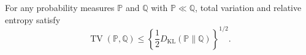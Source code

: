 For any probability measures \(\mathbb P\) and \(\mathbb Q\) with
\(\mathbb P\ll\mathbb Q\), total variation and relative entropy satisfy
\[
\operatorname{TV}(\mathbb P,\mathbb Q)
\leq\left\{\frac12D_{\mathrm{KL}}(\mathbb P\|\mathbb Q)\right\}^{1/2}.
\]